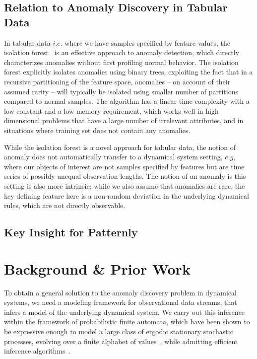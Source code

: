 \documentclass[9pt,journal,compsoc]{IEEEtran}
\begin{document}
{  \subsection{Relation to Anomaly Discovery in Tabular Data}
  In tabular data $i.e.$ where we have samples specified by feature-values, the isolation forest~\cite{liu2008isolation} is an effective approach to anomaly detection, which directly characterizes anomalies  without first profiling normal behavior. The isolation forest  explicitly isolates anomalies using binary trees, exploiting the fact that in a recursive partitioning of the feature space, anomalies -- on account of their assumed rarity -- will typically be isolated using smaller number of partitions compared to normal samples. The algorithm has a linear time complexity with a low constant and a low memory requirement, which works well in high dimensional problems that have a large number of irrelevant attributes, and in situations where training set does not contain any anomalies.

While the isolation forest is a novel approach for tabular data, the notion of anomaly does not automatically transfer to a dynamical system setting, $e.g$, where our objects of interest are not samples specified by features but are time series of possibly unequal observation lengths. The notion of an anomaly is this setting is also more intrinsic; while we also assume that anomalies are rare, the key defining feature here  is a non-random deviation in the underlying dynamical rules, which are not directly observable. 

\subsection{Key Insight for Patternly}

  \section{Background \& Prior Work}
  \label{sec:Background}

To obtain a general solution to the anomaly discovery problem in dynamical systems, we need a modeling framework for observational data streams, that infers a model of the underlying dynamical system. We carry out this inference within the framework of probabilistic finite automata, which have been shown to be expressive enough to model a large class of ergodic stationary stochastic processes, evolving over a finite alphabet of values~\cite{chattopadhyay2020deep,chattopadhyay2014data,crutchfield1994calculi,chattopadhyay2008structural}, while admitting efficient inference algorithms~\cite{chattopadhyay2013abductive}.
  
}
\end{document}

